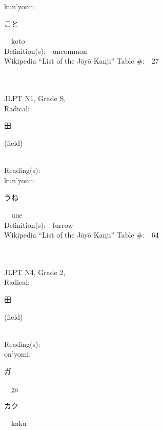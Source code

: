 \begin{multicols}{2}
{\hspace*{1em}}kun'yomi:\ \ \\
{\hspace*{2em}}{\begin{CJK}{UTF8}{min} こと \end{CJK}}\ \ koto\ \ \\
Definition(s):\ \ uncommon \\
Wikipedia ``List of the J\=oy\=o Kanji'' Table \#:\ \ 27 \\
\ \ \\
{\fontsize{34pt}{40pt}  }\ \ \\
{JLPT N1, Grade S, \\Radical:\ \ {\begin{CJK}{UTF8}{min} 田 \end{CJK}} (field) } \\
Reading(s):\ \ \\
{\hspace*{1em}}kun'yomi:\ \ \\
{\hspace*{2em}}{\begin{CJK}{UTF8}{min} うね \end{CJK}}\ \ une\ \ \\
Definition(s):\ \ furrow \\
Wikipedia ``List of the J\=oy\=o Kanji'' Table \#:\ \ 64 \\
\ \ \\
{\fontsize{34pt}{40pt}  }\ \ \\  %
{JLPT N4, Grade 2, \\Radical:\ \ {\begin{CJK}{UTF8}{min} 田 \end{CJK}} (field) } \\
Reading(s):\ \ \\
{\hspace*{1em}}on'yomi:\ \ \\
{\hspace*{2em}}{\begin{CJK}{UTF8}{min} ガ \end{CJK}}\ \ ga\ \ \\
{\hspace*{2em}}{\begin{CJK}{UTF8}{min} カク \end{CJK}}\ \ kaku\ \ \\

\end{multicols}
